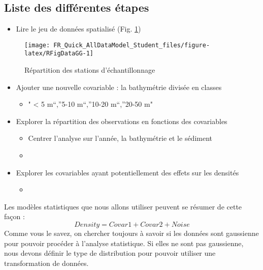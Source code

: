 \documentclass[french,a4paper]{article}
\providecommand{\tightlist}{%
  \setlength{\itemsep}{0pt}\setlength{\parskip}{0pt}}
\begin{document}
\subsection{Liste des différentes
étapes}\label{liste-des-differentes-etapes}

\begin{itemize}
\tightlist
\item
  Lire le jeu de données spatialisé (Fig. \ref{fig:RFigDataGG})
\end{itemize}



\begin{figure}[!h]

{\centering \texttt{[image: FR\_Quick\_AllDataModel\_Student\_files/figure-latex/RFigDataGG-1]} 

}

\caption{Répartition des stations d'échantillonnage}\label{fig:RFigDataGG}
\end{figure}

\begin{itemize}
\tightlist
\item
  Ajouter une nouvelle covariable : la bathymétrie divisée en classes

  \begin{itemize}
  \tightlist
  \item
    " \textless{} 5 m``,''5-10 m``,''10-20 m``,''20-50 m"
  \end{itemize}
\item
  Explorer la répartition des observations en fonctions des covariables

  \begin{itemize}
  \tightlist
  \item
    Centrer l'analyse sur l'année, la bathymétrie et le sédiment
  \item
  \end{itemize}
\item
  Explorer les covariables ayant potentiellement des effets sur les
  densités

  \begin{itemize}
  \tightlist
  \item
  \end{itemize}
\end{itemize}

Les modèles statistiques que nous allons utiliser peuvent se résumer de
cette façon : \[Density = Covar1 + Covar2 + Noise\] Comme vous le savez,
on chercher toujours à savoir si les données sont gaussienne pour
pouvoir procéder à l'analyse statistique. Si elles ne sont pas
gaussienne, nous devons définir le type de distribution pour pouvoir
utiliser une transformation de données.
\end{document}
